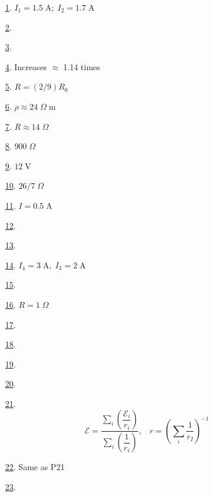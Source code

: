 
\begin{multicols}{2}
\begin{enumerate}
	\item [\hyperlink{P1}{1}.] $I_1=1.5\;\text{A};\;I_2=1.7\;\text{A}$ %
	\item [\hyperlink{P2}{2}.]  %
	\item [\hyperlink{P3}{3}.]  %
	\item [\hyperlink{P4}{4}.] Increases $\approx$ 1.14 times %
	\item [\hyperlink{P5}{5}.] $R=(2/9)R_0$ %
	\item [\hyperlink{P6}{6}.] $\rho\approx24\;\Omega\;\text{m}$ %
	\item [\hyperlink{P7}{7}.] $R\approx14\;\Omega$ %
	\item [\hyperlink{P8}{8}.] $900\;\Omega$ %
	\item [\hyperlink{P9}{9}.] $12\;\text{V}$ %
	\item [\hyperlink{P10}{10}.] $26/7\;\Omega$ %
	\item [\hyperlink{P11}{11}.] $I=0.5\;\text{A}$ %
	\item [\hyperlink{P12}{12}.]  %
	\item [\hyperlink{P13}{13}.]  %
	\item [\hyperlink{P14}{14}.] $I_4=3\;\text{A},\;I_3=2\;\text{A}$ %
	\item [\hyperlink{P15}{15}.]  %
	\item [\hyperlink{P16}{16}.] $R=1\;\Omega$ %
	\item [\hyperlink{P17}{17}.]  %
	\item [\hyperlink{P18}{18}.]  %
	\item [\hyperlink{P19}{19}.]  %
	\item [\hyperlink{P20}{20}.]  %
	\item [\hyperlink{P21}{21}.] $$\mathcal{E}=\dfrac{\sum_i\left(\dfrac{\mathcal{E}_i}{r_i}\right)}{\sum_i\left(\dfrac{1}{r_i}\right)},\;\;\;r=\left(\sum_i\dfrac{1}{r_I}\right)^{-1}$$ %
	\item [\hyperlink{P22}{22}.] Same as P21 %
	\item [\hyperlink{P23}{23}.]  %

\end{enumerate}
\end{multicols}
